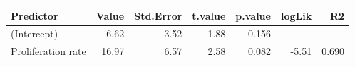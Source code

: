 \begin{table}[ht]
\centering
\begin{tabular}{lrrrrrr}
  \hline
Predictor & Value & Std.Error & t.value & p.value & logLik & R2 \\ 
  \hline
(Intercept) & -6.62 & 3.52 & -1.88 & 0.156 &  &  \\ 
  Proliferation rate & 16.97 & 6.57 & 2.58 & 0.082 & -5.51 & 0.690 \\ 
   \hline
\end{tabular}
\end{table}
